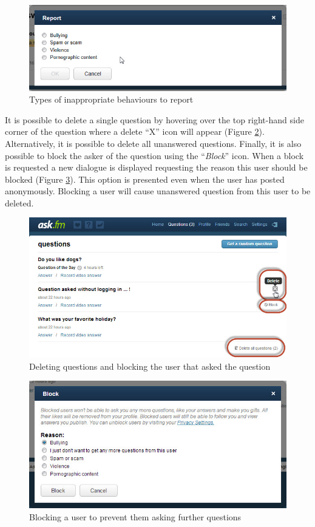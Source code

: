 \begin{figure}[h!]
	\centering
	\includegraphics[scale=0.5]{Figures/Chapter2/report_02.jpg}
	\caption{Types of inappropriate behaviours to report}
	\label{fig:report_02}
\end{figure}

It is possible to delete a single question by hovering over the top right-hand side corner of the question where a delete ``X'' icon will appear (Figure \ref{fig:delete}). Alternatively, it is possible to delete all unanswered questions. Finally, it is also possible to block the asker of the question using the ``\textit{Block}'' icon. When a block is requested a new dialogue is displayed requesting the reason this user should be blocked (Figure \ref{fig:block}). This option is presented even when the user has posted anonymously. Blocking a user will cause unanswered question from this user to be deleted. 

\begin{figure}[h!]
	\centering
	\includegraphics[scale=0.5]{Figures/Chapter2/DeleteQuestion.jpg}
	\caption{Deleting questions and blocking the user that asked the question}
	\label{fig:delete}
\end{figure}


\begin{figure}[h!]
	\centering
	\includegraphics[scale=0.5]{Figures/Chapter2/Block.jpg}
	\caption{Blocking a user to prevent them asking further questions}
	\label{fig:block}
\end{figure}

